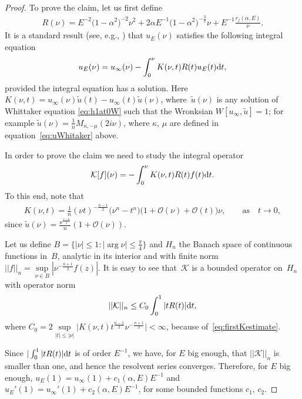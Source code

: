 \documentclass[pdftex]{sigma}
\numberwithin{equation}{section}
\newcommand{\al}{\alpha}
\begin{document}
\begin{proof}
	To prove the claim, let us f\/irst def\/ine
	\begin{gather*}
	R(\nu)=E^{-2}\big(1-\al^2\big)^{-2}\nu^2 + 2 \al E^{-1}\big(1-\al^2\big)^{-\frac32} \nu+E^{-1}\frac{r_j(\al,E)}{\nu}.
	\end{gather*}
	It is a standard result (see, e.g., \cite[Section~4]{erdelyi10}) that $u_E(\nu)$ satisf\/ies the following integral equation
	\begin{gather*}%
	u_E(\nu)=u_{\infty}(\nu)-\int_0^{\nu}K(\nu,t)R(t)u_E(t) {\rm d}t ,
	\end{gather*}
provided the integral equation has a solution. Here $K(\nu,t)=u_{\infty}(\nu)\tilde{u}(t)-u_{\infty}(t)\tilde{u}(\nu)$, where~$\tilde{u}(\nu)$ is any solution of Whittaker equation \eqref{eq:h1at0W} such that the Wronksian $W[u_{\infty},\tilde{u}]=1$; for example $\tilde{u}(\nu)=\frac{1}{n}M_{\kappa,-\mu}(2 i \nu)$, where $\kappa$, $\mu$ are def\/ined in equation~\eqref{eq:uWhitaker} above.
	
In order to prove the claim we need to study the integral operator
	\begin{gather*}
	\mathcal{K}[f](\nu)=-\int_{0}^\nu K(\nu,t) R(t) f(t) {\rm d}t.
	\end{gather*}
To this end, note that
	\begin{gather}\label{eq:firstKestimate}
	K(\nu,t)=\frac{1}{n}(\nu t)^{-\frac{n-1}2}\big(\nu^n-t^n\big)\big(1+ \mathcal{O}(\nu)+\mathcal{O}(t) \big)\nu, \qquad \mbox{as} \quad t \to 0 ,
	\end{gather}
	since $\tilde{u}(\nu)=\frac{\nu^{\frac{1-n}{2}}}{n} ( 1+ \mathcal{O}(\nu) )$.
	
	Let us def\/ine $B=\{|\nu|\leq 1\colon |\arg{\nu}|\leq \frac{\pi}{4}\}$ and $H_n$ the Banach space of continuous functions in~$B$, analytic in its interior and with f\/inite norm $||f||_n=\sup\limits_{\nu \in B} |\nu^{-\frac{n+1}{2}}f(z)|$. It is easy to see that~$\mathcal{K} $ is a bounded operator on~$H_n$ with operator norm
	\begin{gather*}
	||\mathcal{K}||_n \leq C_0 \int_0^1 |t R(t)| {\rm d}t,
	\end{gather*}
	where $C_0=2 \sup\limits_{|t|\leq |\nu|}\big|K(\nu,t)t^{\frac{n-1}{2}}\nu^{-\frac{n+1}{2}}\big| <\infty$, because of~\eqref{eq:firstKestimate}.

Since $|\int_0^1 |t R(t)|{\rm d}t$ is of order $E^{-1}$, we have, for $E$ big enough, that $||\mathcal{K}||_n$ is smaller than one, and hence the resolvent series converges. Therefore, for $E$ big enough, $ u_E(1)=u_{\infty}(1)+c_1(\al,E) E^{-1} $ and $ u_E'(1)=u_{\infty}'(1)+c_2(\al,E) E^{-1}$, for some bounded functions $c_1$, $c_2$.
	

\end{proof}
\end{document}
